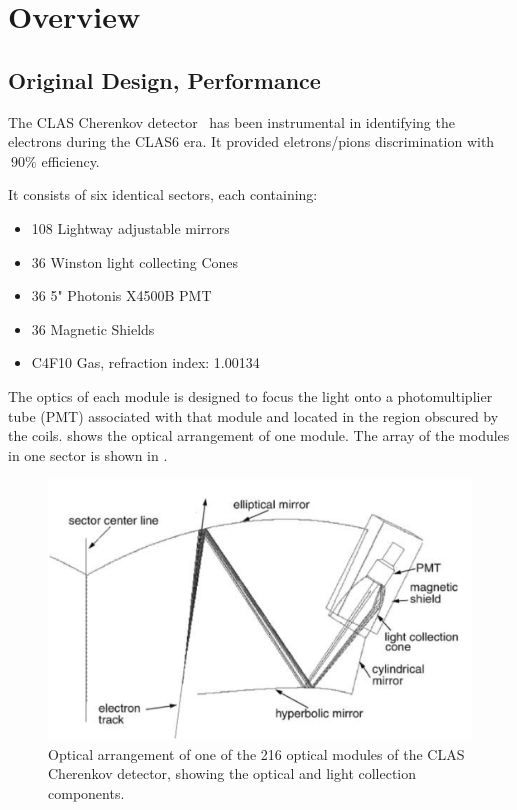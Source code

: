 \section{Overview}



\subsection{Original Design, Performance}

The CLAS Cherenkov detector~\cite{Adams:2001kk} has been instrumental in identifying the electrons during the CLAS6 era.
It provided eletrons/pions discrimination with $~90\%$ efficiency.

It consists of six identical sectors, each containing:

\begin{itemize}
	\item 108 Lightway adjustable mirrors
	\item 36 Winston light collecting Cones
	\item 36 5" Photonis X4500B PMT
	\item 36 Magnetic Shields
	\item C4F10 Gas, refraction index: 1.00134
\end{itemize}


The optics of each module is designed to focus the light onto a photomultiplier tube (PMT) associated with that module and located in the region obscured by the coils.
 shows the optical arrangement of one module. The array of the modules in one sector is shown in .

\begin{figure}
	\centering
	\includegraphics[width=1.0\columnwidth,keepaspectratio]{img/optics.png}
	\caption{Optical arrangement of one of the 216 optical modules of the CLAS Cherenkov detector, showing the optical and light collection components.}
	\label{fig:optics}
\end{figure}

